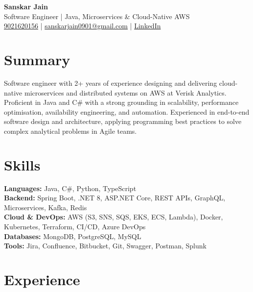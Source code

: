 \documentclass[letterpaper,10pt]{article}
\begin{document}
\begin{center}
    {\LARGE \textbf{Sanskar Jain}} \\
    \vspace{2pt}
    Software Engineer | Java, Microservices \& Cloud-Native AWS \\
    \vspace{2pt}
    \href{tel:9021620156}{9021620156} \;|\;
    \href{mailto:sanskarjain0901@gmail.com}{sanskarjain0901@gmail.com} \;|\;
    \href{https://www.linkedin.com/in/sanskar-jain0901/}{LinkedIn}
\end{center}

\vspace{3pt}

\section*{Summary}
Software engineer with 2+ years of experience designing and delivering cloud-native microservices and distributed systems on AWS at Verisk Analytics.
Proficient in Java and C\# with a strong grounding in scalability, performance optimisation, availability engineering, and automation.
Experienced in end-to-end software design and architecture, applying programming best practices to solve complex analytical problems in Agile teams.

\section*{Skills}
\textbf{Languages:} Java, C\#, Python, TypeScript \\
\textbf{Backend:} Spring Boot, .NET 8, ASP.NET Core, REST APIs, GraphQL, Microservices, Kafka, Redis \\
\textbf{Cloud \& DevOps:} AWS (S3, SNS, SQS, EKS, ECS, Lambda), Docker, Kubernetes, Terraform, CI/CD, Azure DevOps \\
\textbf{Databases:} MongoDB, PostgreSQL, MySQL \\
\textbf{Tools:} Jira, Confluence, Bitbucket, Git, Swagger, Postman, Splunk

\section*{Experience}
\end{document}
